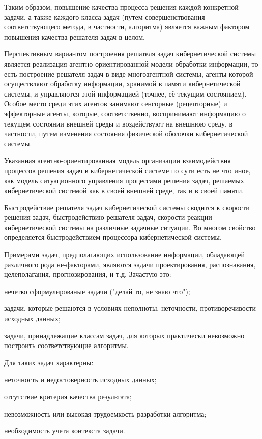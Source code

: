 Таким образом, повышение качества процесса решения каждой конкретной задачи, а также каждого класса задач (путем совершенствования соответствующего метода, в частности, алгоритма) является важным фактором повышения качества решателя задач в целом.

Перспективным вариантом построения решателя задач кибернетической системы является реализация агентно-ориентированной модели обработки информации, то есть построение решателя задач в виде многоагентной системы, агенты которой осуществляют обработку информации, хранимой в памяти кибернетической системы, и управляются этой информацией (точнее, её текущим состоянием). 
Особое место среди этих агентов занимают сенсорные (рецепторные) и эффекторные агенты, которые, соответственно, воспринимают информацию о текущем состоянии внешней среды и воздействуют на внешнюю среду, в частности, путем изменения состояния физической оболочки кибернетической системы.

Указанная агентно-ориентированная модель организации взаимодействия процессов решения задач в кибернетической системе по сути есть не что иное, как модель ситуационного управления процессами решения задач, решаемых кибернетической системой как в своей внешней среде, так и в своей памяти.

Быстродействие решателя задач кибернетической системы сводится к скорости решения задач, быстродействию решателя задач, скорости реакции кибернетической системы на различные задачные ситуации.
Во многом свойство определяется быстродействием процессора кибернетической системы.

Примерами задач, предполагающих использование информации, обладающей различного рода не-факторами, являются задачи проектирования, распознавания, целеполагания, прогнозирования, и т.д. Зачастую это:
\begin{textitemize}
    \item нечетко сформулированые задачи ("делай то, не знаю что");
    \item задачи, которые решаются в условиях неполноты, неточности, противоречивости исходных данных;
    \item задачи, принадлежащие классам задач, для которых практически невозможно построить соответствующие алгоритмы.
\end{textitemize}
Для таких задач характерны:
\begin{textitemize}
    \item неточность и недостоверность исходных данных;
    \item отсутствие критерия качества результата;
    \item невозможность или высокая трудоемкость разработки алгоритма;
    \item необходимость учета контекста задачи.
\end{textitemize}

